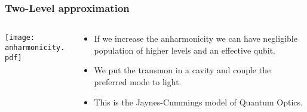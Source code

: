 \documentclass[xetex]{beamer}
\begin{document}
\begin{frame}
    \frametitle{Two-Level approximation}
    \begin{columns}[c]
        \begin{column}{0.55\linewidth}
    \texttt{[image: anharmonicity.pdf]}
        \end{column}
        \begin{column}{0.45\linewidth}
            \begin{itemize}
                \item If we increase the anharmonicity we can 
                        have negligible population of higher levels 
                        and an effective qubit.
                \item We put the transmon in a cavity and couple 
                        the preferred mode to light.
                \item This is the Jaynes-Cummings model of 
                        Quantum Optics. 
            \end{itemize}
        \end{column}
    \end{columns}
\end{frame}
\end{document}
